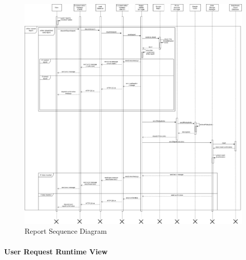 \documentclass[titlepage]{article}
\begin{document}
\begin{figure}[h]
	\includegraphics[scale=0.298]{Diagrams/Sequence Diagrams/Runtime View Diagram report.png}
	\caption{Report Sequence Diagram}
\end{figure}
\FloatBarrier

\paragraph{User Request Runtime View\\ \\}
\end{document}
